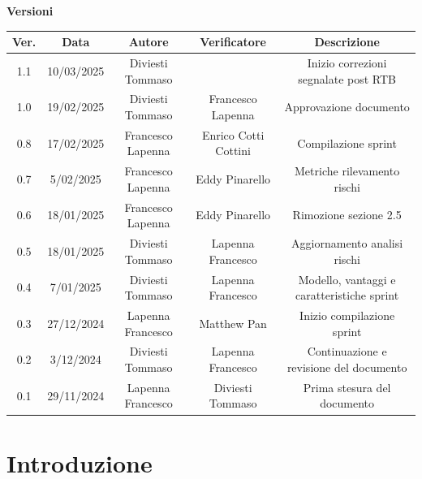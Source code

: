 \documentclass{article}
\begin{document}
\newpage
\begin{table}[h!]
\centering
\textbf{Versioni} \\ %
\vspace{2mm} %
\begin{tabular}{|c|c|c|c|c|}
    \hline
    \textbf{Ver.} & \textbf{Data} & \textbf{Autore} & \textbf{Verificatore} & \textbf{Descrizione} \\
    \hline
    1.1 & 10/03/2025 & Diviesti Tommaso &  & Inizio correzioni segnalate post RTB \\
    1.0 & 19/02/2025 & Diviesti Tommaso & Francesco Lapenna & Approvazione documento \\
    0.8 & 17/02/2025 & Francesco Lapenna & Enrico Cotti Cottini & Compilazione sprint \\
    0.7 & 5/02/2025 & Francesco Lapenna & Eddy Pinarello & Metriche rilevamento rischi \\
    0.6 & 18/01/2025 & Francesco Lapenna & Eddy Pinarello & Rimozione sezione 2.5 \\
    0.5 & 18/01/2025 & Diviesti Tommaso & Lapenna Francesco & Aggiornamento analisi rischi \\
    0.4 & 7/01/2025 & Diviesti Tommaso & Lapenna Francesco & Modello, vantaggi e caratteristiche sprint \\
    0.3 & 27/12/2024 & Lapenna Francesco & Matthew Pan & Inizio compilazione sprint \\
    0.2 & 3/12/2024 & Diviesti Tommaso & Lapenna Francesco & Continuazione e revisione del documento \\
    0.1 & 29/11/2024 & Lapenna Francesco & Diviesti Tommaso & Prima stesura del documento \\
    \hline
\end{tabular}
\end{table}



\newpage
\tableofcontents
\listoftables
\listoffigures



\newpage
\section{Introduzione}
\end{document}
